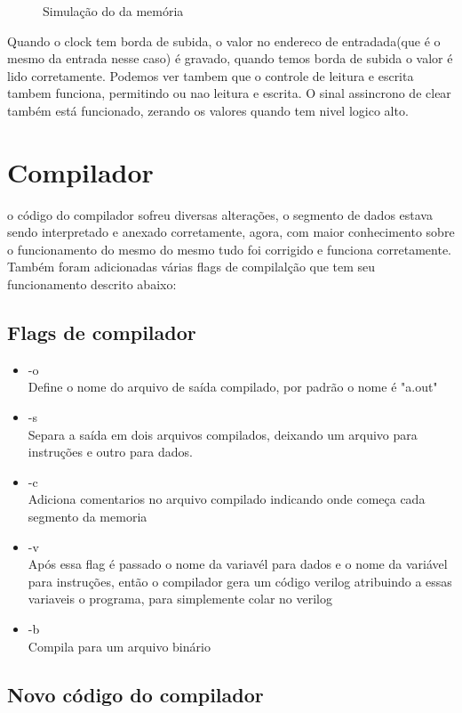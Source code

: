 \documentclass[a4paper, 10pt]{article}
\begin{document}
\begin{itemize}
\begin{figure}[H]
		\caption{Simulação do da memória}
		\label{Rotulo}
	\end{figure}
	\vfill
	Quando o clock tem borda de subida, o valor no endereco de entradada(que é o mesmo da entrada nesse caso) é gravado, quando temos borda de subida o valor é lido corretamente. Podemos ver tambem que o controle de leitura e escrita tambem funciona, permitindo ou nao leitura e escrita. O sinal assincrono de clear também está funcionado, zerando os valores quando tem nivel logico alto.
\end{itemize}
\newpage
\section{Compilador}
o código do compilador sofreu diversas alterações, o segmento de dados estava sendo interpretado e anexado corretamente, agora, com maior conhecimento sobre o funcionamento do mesmo do mesmo tudo foi corrigido e funciona corretamente. Também foram adicionadas várias flags de compilalção que tem seu funcionamento descrito abaixo:
\subsection{Flags de compilador}
\begin{itemize}
	\item -o\\ Define o nome do arquivo de saída compilado, por padrão o nome é "a.out"
	\item -s\\ Separa a saída em dois arquivos compilados, deixando um arquivo para instruções e outro para dados.
	\item -c\\ Adiciona comentarios no arquivo compilado indicando onde começa cada segmento da memoria
	\item -v\\ Após essa flag é passado o nome da variavél para dados e o nome da variável para instruções, então o compilador gera um código verilog atribuindo a essas variaveis o programa, para simplemente colar no verilog
	\item -b\\ Compila para um arquivo binário
\end{itemize}
\subsection{Novo código do compilador}

\vfill
\end{document}
